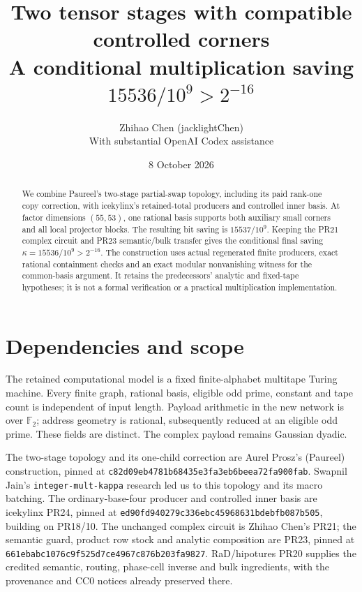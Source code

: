 \documentclass[11pt]{article}
\title{Two tensor stages with compatible controlled corners\\
\large A conditional multiplication saving $15536/10^9>2^{-16}$}
\author{Zhihao Chen (jacklightChen)\\\small With substantial OpenAI Codex assistance}
\date{8 October 2026}
\begin{document}
\maketitle
\begin{abstract}
We combine Paureel's two-stage partial-swap topology, including its paid
rank-one copy correction, with icekylinx's retained-total producers and
controlled inner basis. At factor dimensions $(55,53)$, one rational basis
supports both auxiliary small corners and all local projector blocks.
The resulting bit saving is $15537/10^9$. Keeping the PR21 complex circuit
and PR23 semantic/bulk transfer gives the conditional final saving
$\kappa=15536/10^9>2^{-16}$. The construction uses actual regenerated
finite producers, exact rational containment checks and an exact modular
nonvanishing witness for the common-basis argument. It retains the
predecessors' analytic and fixed-tape hypotheses; it is not a formal
verification or a practical multiplication implementation.
\end{abstract}

\section{Dependencies and scope}
The retained computational model is a fixed finite-alphabet multitape
Turing machine. Every finite graph, rational basis, eligible odd prime,
constant and tape count is independent of input length. Payload arithmetic
in the new network is over $\mathbb F_2$; address geometry is rational,
subsequently reduced at an eligible odd prime. These fields are distinct.
The complex payload remains Gaussian dyadic.

The two-stage topology and its one-child correction are Aurel Prosz's
(Paureel) construction, pinned at
\texttt{c82d09eb4781b68435e3fa3eb6beea72fa900fab}. Swapnil Jain's
\texttt{integer-mult-kappa} research led us to this topology and its
macro batching. The ordinary-base-four producer and controlled inner
basis are icekylinx PR24, pinned at
\texttt{ed90fd940279c336ebc45968631bdebfb087b505}, building on PR18/10.
The unchanged complex circuit is Zhihao Chen's PR21; the semantic guard,
product row stock and analytic composition are PR23, pinned at
\texttt{661ebabc1076c9f525d7ce4967c876b203fa9827}.
RaD/hipotures PR20
supplies the credited semantic, routing, phase-cell inverse and bulk
ingredients, with the provenance and CC0 notices already preserved there.
\end{document}

